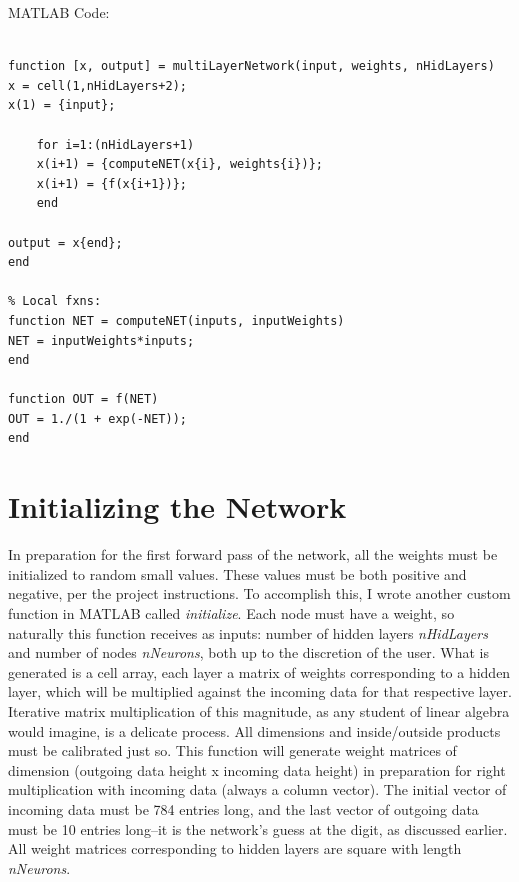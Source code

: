 \documentclass[letterpaper,11pt]{article}
\begin{document}
\vspace{5mm}
MATLAB Code:

\begin{verbatim}

function [x, output] = multiLayerNetwork(input, weights, nHidLayers)
x = cell(1,nHidLayers+2);
x(1) = {input};

    for i=1:(nHidLayers+1)
    x(i+1) = {computeNET(x{i}, weights{i})};
    x(i+1) = {f(x{i+1})};
    end
    
output = x{end};
end

% Local fxns:
function NET = computeNET(inputs, inputWeights)
NET = inputWeights*inputs;
end

function OUT = f(NET)
OUT = 1./(1 + exp(-NET));
end

\end{verbatim}



\section{Initializing the Network}

In preparation for the first forward pass of the network, all the weights must be initialized to random small values. These values must be both positive and negative, per the project instructions. To accomplish this, I wrote another custom function in MATLAB called \emph{initialize}. Each node must have a weight, so naturally this function receives as inputs: number of hidden layers \emph{nHidLayers} and number of nodes \emph{nNeurons}, both up to the discretion of the user. What is generated is a cell array, each layer a matrix of weights corresponding to a hidden layer, which will be multiplied against the incoming data for that respective layer.\\

Iterative matrix multiplication of this magnitude, as any student of linear algebra would imagine, is a delicate process. All dimensions and inside/outside products must be calibrated just so. This function will generate weight matrices of dimension (outgoing data height x incoming data height) in preparation for right multiplication with incoming data (always a column vector). The initial vector of incoming data must be 784 entries long, and the last vector of outgoing data must be 10 entries long--it is the network's guess at the digit, as discussed earlier. All weight matrices corresponding to hidden layers are square with length \emph{nNeurons}.\\
\end{document}
